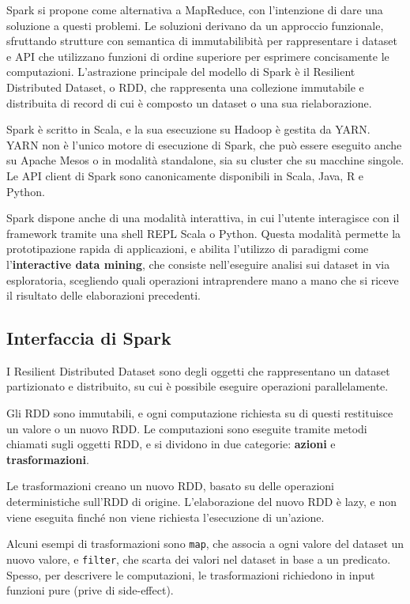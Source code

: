 \documentclass[italian,a4paper, twoside, 12pt]{report}
\begin{document}
Spark si propone come alternativa a MapReduce, con l'intenzione di dare
una soluzione a questi problemi. Le soluzioni derivano da un approccio
funzionale, sfruttando strutture con semantica di immutabilibità per
rappresentare i dataset e API che utilizzano funzioni di ordine
superiore per esprimere concisamente le computazioni. L'astrazione
principale del modello di Spark è il Resilient Distributed Dataset, o
RDD, che rappresenta una collezione immutabile e distribuita di record
di cui è composto un dataset o una sua rielaborazione.

Spark è scritto in Scala, e la sua esecuzione su Hadoop è gestita da
YARN. YARN non è l'unico motore di esecuzione di Spark, che può essere
eseguito anche su Apache Mesos o in modalità standalone, sia su cluster
che su macchine singole. Le API client di Spark sono canonicamente
disponibili in Scala, Java, R e Python.

Spark dispone anche di una modalità interattiva, in cui l'utente
interagisce con il framework tramite una shell REPL Scala o Python.
Questa modalità permette la prototipazione rapida di applicazioni, e
abilita l'utilizzo di paradigmi come l'\textbf{interactive data mining},
che consiste nell'eseguire analisi sui dataset in via esploratoria,
scegliendo quali operazioni intraprendere mano a mano che si riceve il
risultato delle elaborazioni precedenti.

\subsection{Interfaccia di Spark}\label{interfaccia-di-spark}

I Resilient Distributed Dataset sono degli oggetti che rappresentano un
dataset partizionato e distribuito, su cui è possibile eseguire
operazioni parallelamente.

Gli RDD sono immutabili, e ogni computazione richiesta su di questi
restituisce un valore o un nuovo RDD. Le computazioni sono eseguite
tramite metodi chiamati sugli oggetti RDD, e si dividono in due
categorie: \textbf{azioni} e \textbf{trasformazioni}.

Le trasformazioni creano un nuovo RDD, basato su delle operazioni
deterministiche sull'RDD di origine. L'elaborazione del nuovo RDD è
lazy, e non viene eseguita finché non viene richiesta l'esecuzione di
un'azione.

Alcuni esempi di trasformazioni sono \lstinline!map!, che associa a ogni
valore del dataset un nuovo valore, e \lstinline!filter!, che scarta dei
valori nel dataset in base a un predicato. Spesso, per descrivere le
computazioni, le trasformazioni richiedono in input funzioni pure (prive
di side-effect).
\end{document}
